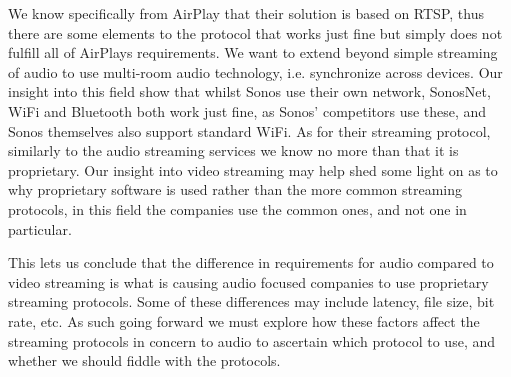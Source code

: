 We know specifically from AirPlay that their solution is based on \ac{RTSP}, thus there are some elements to the protocol that works just fine but simply does not fulfill all of AirPlays requirements.
We want to extend beyond simple streaming of audio to use multi-room audio technology, i.e. synchronize across devices. 
Our insight into this field show that whilst Sonos use their own network, SonosNet, WiFi and Bluetooth both work just fine, as Sonos' competitors use these, and Sonos themselves also support standard WiFi.
As for their streaming protocol, similarly to the audio streaming services we know no more than that it is proprietary.
Our insight into video streaming may help shed some light on as to why proprietary software is used rather than the more common streaming protocols, in this field the companies use the common ones, and not one in particular.

This lets us conclude that the difference in requirements for audio compared to video streaming is what is causing audio focused companies to use proprietary streaming protocols.
Some of these differences may include latency, file size, bit rate, etc.
As such going forward we must explore how these factors affect the streaming protocols in concern to audio to ascertain which protocol to use, and whether we should fiddle with the protocols.











